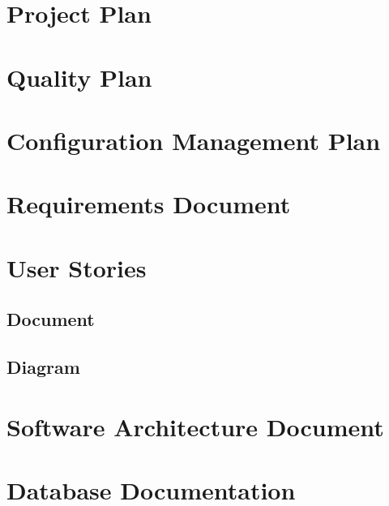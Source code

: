 
\chapter{Project Plan}



\chapter{Quality Plan}



\chapter{Configuration Management Plan}



\chapter{Requirements Document}




\chapter{User Stories}

\section{Document}



\section{Diagram}


\chapter{Software Architecture Document}



\chapter{Database Documentation}



